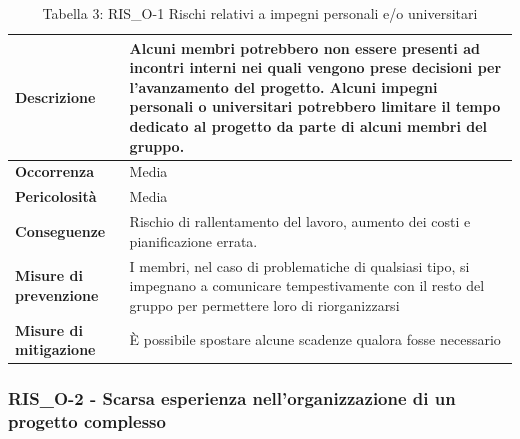 \documentclass[a4paper,10pt]{article}
\begin{document}
\begin{table}[H]
\centering
\renewcommand{\arraystretch}{1.3}

\begin{tabularx}{\textwidth}{|p{4cm}|X|}
\hline
\textbf{Descrizione} & 
Alcuni membri potrebbero non essere presenti ad incontri interni nei quali vengono prese decisioni per l'avanzamento del progetto. Alcuni impegni personali o universitari potrebbero limitare il tempo dedicato al progetto da parte di alcuni membri del gruppo. \\ \hline

\textbf{Occorrenza} & Media \\ \hline

\textbf{Pericolosità} & Media \\ \hline

\textbf{Conseguenze} & 
Rischio di rallentamento del lavoro, aumento dei costi e pianificazione errata. \\ \hline

\textbf{Misure di prevenzione} & I membri, nel caso di problematiche di qualsiasi tipo, si impegnano a comunicare tempestivamente con il resto del gruppo per permettere loro di riorganizzarsi \\ \hline

\textbf{Misure di mitigazione} &
È possibile spostare alcune scadenze qualora fosse necessario \\ \hline

\end{tabularx}

\caption{Tabella 3: RIS\_O-1 Rischi relativi a impegni personali e/o universitari}
\end{table}


\subsubsection{RIS\_O-2 - Scarsa esperienza nell'organizzazione di un progetto complesso}
\end{document}
